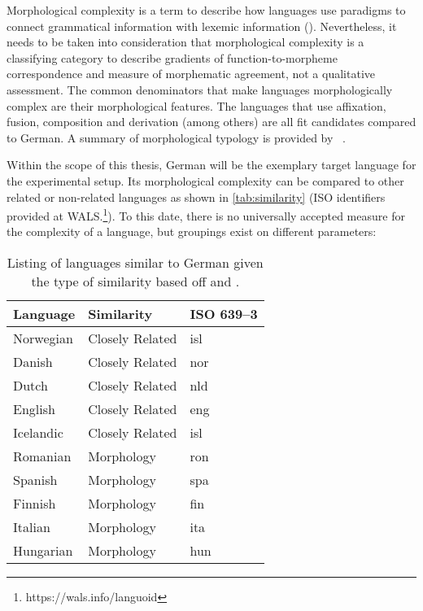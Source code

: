 Morphological complexity is a term to describe how languages use paradigms to connect grammatical information with lexemic information (\cite{MORPHOLOGICALCOMPLEXITY}).
Nevertheless, it needs to be taken into consideration that morphological complexity is a classifying category to describe gradients of function-to-morpheme correspondence and measure of morphematic agreement, not a qualitative assessment.
The common denominators that make languages morphologically complex are their morphological features.
The languages that use affixation, fusion, composition and derivation (among others) are all fit candidates compared to German.
A summary of morphological typology is provided by ~\textcite[78--93]{LINGUISTICTYPOLOGY}.

Within the scope of this thesis, German will be the exemplary target language for the experimental setup.
Its morphological complexity can be compared to other related or non-related languages as shown in \autoref{tab:similarity} (ISO identifiers provided at WALS.\footnote{https://wals.info/languoid}).
To this date, there is no universally accepted measure for the complexity of a language, but groupings exist on different parameters:
\\
\begin{table}[h]
    \centering
    \caption[List of similar languages]{Listing of languages similar to German given the type of similarity based off \textcite{lehmann} and \textcite{MORPHOSYNTAXCOMPLEXITY1}.}
    \label{tab:similarity}
    \begin{tabular}{lll}
        \toprule
        \textbf{Language} & \textbf{Similarity} & \textbf{ISO 639--3} \\
        \midrule
        Norwegian & Closely Related & isl \\
        Danish & Closely Related & nor \\
        Dutch & Closely Related & nld \\
        English & Closely Related & eng \\
        Icelandic & Closely Related & isl \\
        Romanian & Morphology & ron \\
        Spanish & Morphology & spa \\
        Finnish & Morphology & fin \\
        Italian & Morphology & ita \\
        Hungarian & Morphology & hun \\
        \bottomrule
    \end{tabular}

\end{table}

